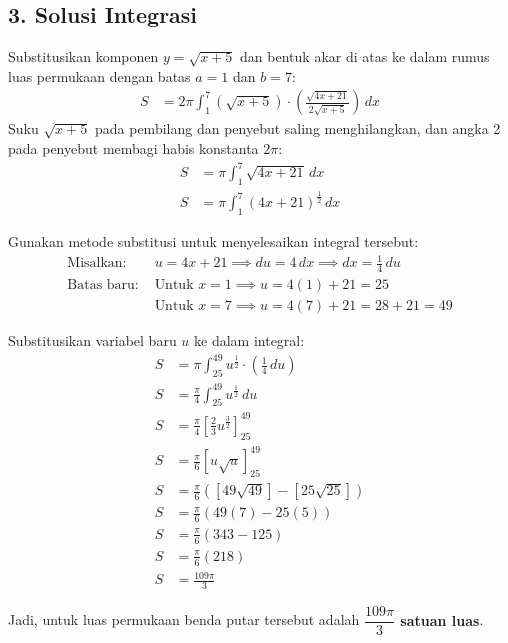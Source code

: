 \documentclass[12pt,a4paper]{article}
\begin{document}
\subsection*{3. Solusi Integrasi}
Substitusikan komponen $y = \sqrt{x+5}$ dan bentuk akar di atas ke dalam rumus luas permukaan dengan batas $a = 1$ dan $b = 7$:
\begin{align*}
  S &= 2\pi \int_{1}^{7} \left(\sqrt{x+5}\right) \cdot \left(\frac{\sqrt{4x+21}}{2\sqrt{x+5}}\right) \, dx
\end{align*}
Suku $\sqrt{x+5}$ pada pembilang dan penyebut saling menghilangkan, dan angka 2 pada penyebut membagi habis konstanta $2\pi$:
\begin{align*}
  S &= \pi \int_{1}^{7} \sqrt{4x+21} \, dx \\
  S &= \pi \int_{1}^{7} (4x+21)^{\frac{1}{2}} \, dx
\end{align*}

Gunakan metode substitusi untuk menyelesaikan integral tersebut:
\begin{align*}
  \text{Misalkan: } & u = 4x + 21 \implies du = 4 \, dx \implies dx = \frac{1}{4} \, du \\
  \text{Batas baru: } & \text{Untuk } x = 1 \implies u = 4(1) + 21 = 25 \\
  & \text{Untuk } x = 7 \implies u = 4(7) + 21 = 28 + 21 = 49
\end{align*}

Substitusikan variabel baru $u$ ke dalam integral:
\begin{align*}
  S &= \pi \int_{25}^{49} u^{\frac{1}{2}} \cdot \left(\frac{1}{4} \, du\right) \\
  S &= \frac{\pi}{4} \int_{25}^{49} u^{\frac{1}{2}} \, du \\
  S &= \frac{\pi}{4} \left[ \frac{2}{3}u^{\frac{3}{2}} \right]_{25}^{49} \\
  S &= \frac{\pi}{6} \left[ u\sqrt{u} \right]_{25}^{49} \\
  S &= \frac{\pi}{6} \left( \left[ 49\sqrt{49} \right] - \left[ 25\sqrt{25} \right] \right) \\
  S &= \frac{\pi}{6} \left( 49(7) - 25(5) \right) \\
  S &= \frac{\pi}{6} (343 - 125) \\
  S &= \frac{\pi}{6} (218) \\
  S &= \frac{109\pi}{3}
\end{align*}

Jadi, untuk luas permukaan benda putar tersebut adalah \textbf{$\dfrac{109\pi}{3}$ satuan luas}.
\end{document}
